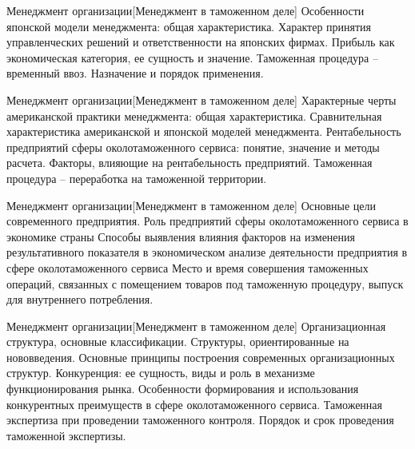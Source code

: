 \documentclass[
	11pt,
	a4paper,
	]
	{article}
\begin{document}
\vfill



\begin{minipage}[t][\miniH]{\miniL}\centering
	 {Менеджмент организации}[Менеджмент в таможенном деле]
		{
			Особенности японской модели менеджмента: общая характеристика. Характер принятия управленческих решений и ответственности на японских фирмах.
		}{
			Прибыль как экономическая категория, ее сущность и значение.
		}{
			Таможенная процедура – временный ввоз. Назначение и порядок применения.
		}
	\lowGE
\end{minipage}





\begin{minipage}[t][\miniH]{\miniL}\centering
	 {Менеджмент организации}[Менеджмент в таможенном деле]
		{
			Характерные черты американской практики менеджмента: общая характеристика. Сравнительная характеристика американской и японской моделей менеджмента.
		}{
			Рентабельность предприятий сферы околотаможенного сервиса: понятие, значение и методы расчета. Факторы, влияющие на рентабельность предприятий.
		}{
			Таможенная процедура – переработка на таможенной территории.
		}
	\lowGE
\end{minipage}

\vfill



\begin{minipage}[t][\miniH]{\miniL}\centering
	 {Менеджмент организации}[Менеджмент в таможенном деле]
		{
			Основные цели современного предприятия. Роль предприятий сферы околотаможенного сервиса в экономике страны
		}{
			Способы выявления влияния факторов на изменения результативного показателя в экономическом анализе деятельности предприятия в сфере околотаможенного сервиса
		}{
			Место и время совершения таможенных операций, связанных с помещением товаров под таможенную процедуру, выпуск для внутреннего потребления.
		}
	\lowGE
\end{minipage}

\vfill



\begin{minipage}[t][\miniH]{\miniL}\centering
	 {Менеджмент организации}[Менеджмент в таможенном деле]
		{
			Организационная структура, основные классификации. Структуры, ориентированные на нововведения. Основные принципы построения современных организационных структур.
		}{
			Конкуренция: ее сущность, виды и роль в механизме функционирования рынка. Особенности формирования и использования конкурентных преимуществ в сфере околотаможенного сервиса.
		}{
			Таможенная экспертиза при проведении таможенного контроля. Порядок и срок проведения таможенной экспертизы.
		}
	\lowGE
\end{minipage}
\end{document}
